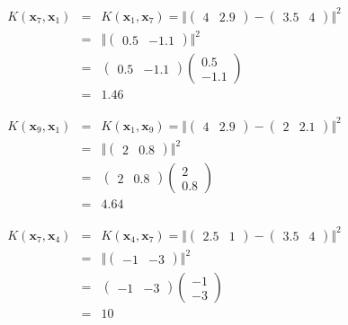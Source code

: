 \documentclass[11pt]{article}
\begin{document}
\begin{enumerate}
\begin{enumerate}
\begin{eqnarray*}
K(\mathbf{x}_7, \mathbf{x}_1) &=& K(\mathbf{x}_1, \mathbf{x}_7) = \Vert (\begin{array}{cc}4 & 2.9 \end{array}) - (\begin{array}{cc}3.5 & 4 \end{array}) \Vert^2 \\
&=& \Vert (\begin{array}{cc} 0.5 & -1.1 \end{array}) \Vert^2 \\
&=& (\begin{array}{cc} 0.5 & -1.1 \end{array}) \left(\begin{array}{c} 0.5 \\ -1.1 \end{array}\right) \\
&=& 1.46
\end{eqnarray*}

\begin{eqnarray*}
K(\mathbf{x}_9, \mathbf{x}_1) &=& K(\mathbf{x}_1, \mathbf{x}_9) = \Vert (\begin{array}{cc}4 & 2.9 \end{array}) - (\begin{array}{cc} 2 & 2.1 \end{array}) \Vert^2 \\
&=& \Vert (\begin{array}{cc} 2 & 0.8 \end{array}) \Vert^2 \\
&=& (\begin{array}{cc} 2 & 0.8 \end{array}) \left(\begin{array}{c} 2 \\ 0.8 \end{array}\right) \\
&=& 4.64
\end{eqnarray*}

\begin{eqnarray*}
K(\mathbf{x}_7, \mathbf{x}_4) &=& K(\mathbf{x}_4, \mathbf{x}_7) = \Vert (\begin{array}{cc} 2.5 & 1 \end{array}) - (\begin{array}{cc} 3.5 & 4 \end{array}) \Vert^2 \\
&=& \Vert (\begin{array}{cc} -1 & -3 \end{array}) \Vert^2 \\
&=& (\begin{array}{cc} -1 & -3 \end{array}) \left(\begin{array}{c} -1 \\ -3 \end{array}\right) \\
&=& 10
\end{eqnarray*}


\end{enumerate}
\end{enumerate}
\end{document}
